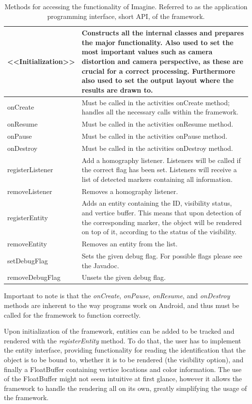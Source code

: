 \begin{table}[H]
	\centering
	{\footnotesize
	\begin{tabulary}{\textwidth}{J || J}
	<<Initialization>> & Constructs all the internal classes and prepares the major functionality. Also used to set the most important values such as camera distortion and camera perspective, as these are crucial for a correct processing. Furthermore also used to set the output layout where the results are drawn to.\\
	\hline
	onCreate & Must be called in the activities onCreate method; handles all the necessary calls within the framework.\\
	\hline
	onResume & Must be called in the activities onResume method.\\
	\hline
	onPause & Must be called in the activities onPause method.\\
	\hline
	onDestroy & Must be called in the activities onDestroy method.\\
	\hline
	registerListener & Add a homography listener. Listeners will be called if the correct flag has been set. Listeners will receive a list of detected markers containing all information.\\
	\hline
	removeListener & Removes a homography listener. \\
	\hline
	registerEntity & Adds an entity containing the ID, visibility status, and vertice buffer. This means that upon detection of the corresponding marker, the object will be rendered on top of it, according to the status of the visibility.\\
	\hline
	removeEntity & Removes an entity from the list.\\
	\hline
	setDebugFlag & Sets the given debug flag. For possible flags please see the Javadoc.\\
	\hline
	removeDebugFlag & Unsets the given debug flag.\\
	\end{tabulary}
	}
	\caption[Application Programming Interface]{Methods for accessing the functionality of Imagine. Referred to as the application programming interface, short API, of the framework.}
	\label{api}
\end{table}

Important to note is that the \textit{onCreate}, \textit{onPause}, \textit{onResume}, and \textit{onDestroy} methods are inherent to the way programs work on Android, and thus must be called for the framework to function correctly.

Upon initialization of the framework, entities can be added to be tracked and rendered with the \textit{registerEntity} method.
To do that, the user has to implement the entity interface, providing functionality for reading the identification that the object is to be bound to, whether it is to be rendered (the visibility option), and finally a FloatBuffer containing vertice locations and color information.
The use of the FloatBuffer might not seem intuitive at first glance, however it allows the framework to handle the rendering all on its own, greatly simplifying the usage of the framework.

